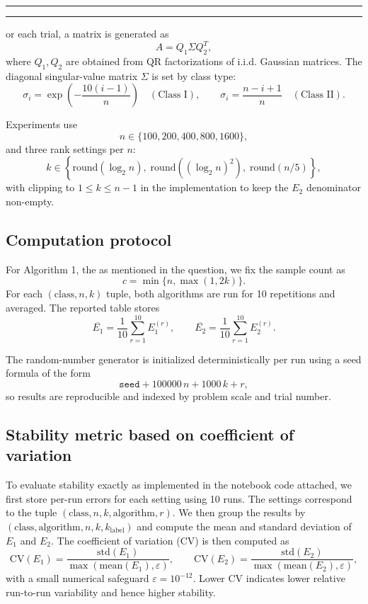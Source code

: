 \documentclass[8pt]{article}
\newcounter{questionCounter}
\newenvironment{question}[2][\arabic{questionCounter}]{%
    \addtocounter{questionCounter}{1}%
    \setcounter{partCounter}{0}%
    \vspace{.25in} \hrule \vspace{0.4em}%
        \noindent{\bf \iftoggle{questionnumbers}{#1: }{}#2}%
    \vspace{0.8em} \hrule \vspace{.10in}%
}{$ $\newpage}
\newcounter{partCounter}[questionCounter]
\begin{document}
\begin{question}
For each trial, a matrix is generated as
\[
A = Q_1\Sigma Q_2^T,
\]
where $Q_1,Q_2$ are obtained from QR factorizations of i.i.d. Gaussian matrices. The diagonal singular-value matrix $\Sigma$ is set by class type:
\[
\sigma_i = \exp\!\left(-\frac{10(i-1)}{n}\right) \quad (\text{Class I}),
\qquad
\sigma_i = \frac{n-i+1}{n} \quad (\text{Class II}).
\]

Experiments use
\[
n \in \{100,200,400,800,1600\},
\]
and three rank settings per $n$:
\[
k \in \left\{\mathrm{round}(\log_2 n),\; \mathrm{round}((\log_2 n)^2),\; \mathrm{round}(n/5)\right\},
\]
with clipping to $1\le k\le n-1$ in the implementation to keep the $E_2$ denominator non-empty.

\subsection{Computation protocol}

For Algorithm 1, the as mentioned in the question, we fix the sample count as
\[
c = \min\{n,\max(1,2k)\}.
\]
For each $(\text{class},n,k)$ tuple, both algorithms are run for 10 repetitions and averaged. The reported table stores
\[
\overline{E_1} = \frac{1}{10}\sum_{r=1}^{10} E_1^{(r)},
\qquad
\overline{E_2} = \frac{1}{10}\sum_{r=1}^{10} E_2^{(r)}.
\]

The random-number generator is initialized deterministically per run using a seed formula of the form
\[
\texttt{seed} + 100000\,n + 1000\,k + r,
\]
so results are reproducible and indexed by problem scale and trial number.

\subsection{Stability metric based on coefficient of variation}

To evaluate stability exactly as implemented in the notebook code attached, we first
store per-run errors for each setting using 10 runs. The settings correspond
to the tuple $(\text{class}, n, k, \text{algorithm}, r)$. We then group the
results by $(\text{class}, \text{algorithm}, n, k, k_{\text{label}})$ and
compute the mean and standard deviation of $E_1$ and $E_2$. The coefficient of variation (CV) is then computed as
\[
\mathrm{CV}(E_1)=\frac{\mathrm{std}(E_1)}{\max(\mathrm{mean}(E_1),\varepsilon)},
\qquad
\mathrm{CV}(E_2)=\frac{\mathrm{std}(E_2)}{\max(\mathrm{mean}(E_2),\varepsilon)},
\]
with a small numerical safeguard $\varepsilon=10^{-12}$. Lower CV indicates lower relative run-to-run variability and hence higher stability.



\end{question}
\end{document}
